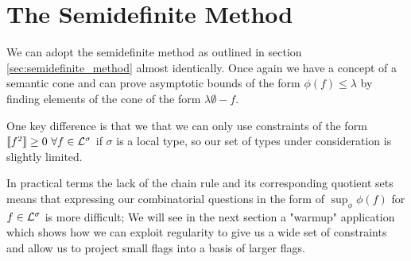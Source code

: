 \section{The Semidefinite Method}

We can adopt the semidefinite method as outlined in section \ref{sec:semidefinite_method}
almost identically. Once again we have a concept of a semantic cone and can prove
asymptotic bounds of the form $\phi(f) \leq \lambda$ by finding elements of the cone of
the form $\lambda\emptyset - f$.

One key difference is that we that we can only use constraints of the form
$\llbracket f^2 \rrbracket \geq 0\ \forall f \in \Lcl^\sigma$ if $\sigma$ is a
local type, so our set of types under consideration is slightly limited.

In practical terms the lack of the chain rule and its corresponding quotient sets means that
expressing our combinatorial questions in the form of $\sup_\phi \phi(f)$ for $f\in\mathcal{L}^\sigma$ is
more difficult; We will see in the next section a "warmup" application which shows how we can
exploit regularity to give us a wide set of constraints and allow us to project small
flags into a basis of larger flags.
